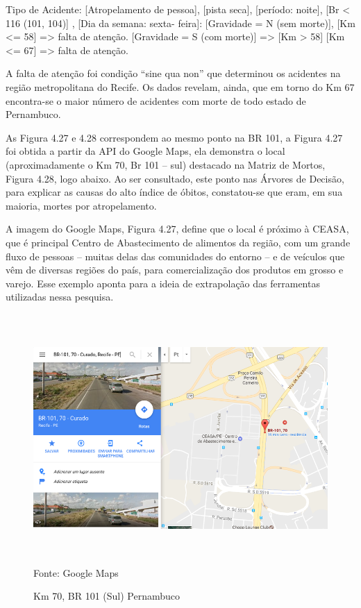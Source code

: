 Tipo de Acidente: [Atropelamento de pessoa], [pista seca],
[período: noite], [Br < 116 (101, 104)] , [Dia da semana: sexta-
feira]:
[Gravidade = N (sem morte)], [Km <= 58] => falta de atenção.
[Gravidade = S (com morte)] => [Km > 58] [Km <= 67] =>
falta de atenção.

\vspace{5mm}

A falta de atenção foi condição ``sine qua non'' que determinou os acidentes na região metropolitana do Recife. Os dados revelam, ainda, que em torno do Km 67 encontra-se o maior número de acidentes com morte de todo estado de Pernambuco.

\vspace{5mm}

As Figura 4.27 e 4.28 correspondem ao mesmo ponto na BR 101, a Figura 4.27 foi obtida a partir da API do Google Maps, ela demonstra o local (aproximadamente o Km 70, Br 101 -- sul) destacado na Matriz de Mortos, Figura 4.28, logo abaixo. Ao ser consultado, este ponto nas Árvores de Decisão, para explicar as causas do alto índice de óbitos, constatou-se que eram, em sua maioria, mortes por atropelamento. 

A imagem do Google Maps, Figura 4.27, define que o local é próximo à CEASA, que é principal Centro de Abastecimento de alimentos da região, com um grande fluxo de pessoas -- muitas delas das comunidades do entorno -- e de veículos que vêm de diversas regiões do país, para comercialização dos produtos em grosso e varejo. Esse exemplo aponta para a ideia de extrapolação das ferramentas utilizadas nessa pesquisa.  

\pagebreak


\begin{figure}[htbp!]
	\centering
	\caption{Km 70, BR 101 (Sul) Pernambuco}
	\label{fig:Km70BR101}
	\includegraphics[width=150mm, height=95mm]{Figuras/Resultados/Km70BR101}\\
	\tiny Fonte: Google Maps
\end{figure}

